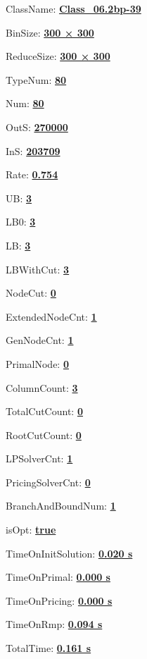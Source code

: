 \documentclass[11pt]{article}
\begin{document}
\pagestyle{empty}


ClassName: \underline{\textbf{Class_06.2bp-39}}
\par
BinSize: \underline{\textbf{300 × 300}}
\par
ReduceSize: \underline{\textbf{300 × 300}}
\par
TypeNum: \underline{\textbf{80}}
\par
Num: \underline{\textbf{80}}
\par
OutS: \underline{\textbf{270000}}
\par
InS: \underline{\textbf{203709}}
\par
Rate: \underline{\textbf{0.754}}
\par
UB: \underline{\textbf{3}}
\par
LB0: \underline{\textbf{3}}
\par
LB: \underline{\textbf{3}}
\par
LBWithCut: \underline{\textbf{3}}
\par
NodeCut: \underline{\textbf{0}}
\par
ExtendedNodeCnt: \underline{\textbf{1}}
\par
GenNodeCnt: \underline{\textbf{1}}
\par
PrimalNode: \underline{\textbf{0}}
\par
ColumnCount: \underline{\textbf{3}}
\par
TotalCutCount: \underline{\textbf{0}}
\par
RootCutCount: \underline{\textbf{0}}
\par
LPSolverCnt: \underline{\textbf{1}}
\par
PricingSolverCnt: \underline{\textbf{0}}
\par
BranchAndBoundNum: \underline{\textbf{1}}
\par
isOpt: \underline{\textbf{true}}
\par
TimeOnInitSolution: \underline{\textbf{0.020 s}}
\par
TimeOnPrimal: \underline{\textbf{0.000 s}}
\par
TimeOnPricing: \underline{\textbf{0.000 s}}
\par
TimeOnRmp: \underline{\textbf{0.094 s}}
\par
TotalTime: \underline{\textbf{0.161 s}}
\par
\newpage
\end{document}
